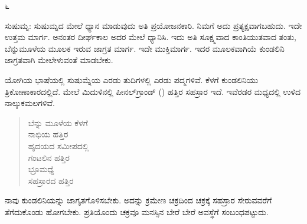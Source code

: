 \begin{center}
೬
\end{center}

ಸುಷುಮ್ನ: ಸುಷುಮ್ನದ ಮೇಲೆ ಧ್ಯಾನ ಮಾಡುವುದು ಅತಿ ಪ್ರಯೋಜನಕಾರಿ. ನಿಮಗೆ ಅದು ಪ್ರತ್ಯಕ್ಷವಾಗಬಹುದು. ಇದೇ ಉತ್ತಮ ಮಾರ್ಗ. ಅನಂತರ ದೀರ್ಘಕಾಲ ಅದರ ಮೇಲೆ ಧ್ಯಾನಿಸಿ. ಇದು ಅತಿ ಸೂಕ್ಷ್ಮವಾದ ಕಾಂತಿಯುತವಾದ ತಂತು, ಬೆನ್ನುಮೂಳೆಯ ಮೂಲಕ ಇರುವ ಜಾಗ್ರತ ಮಾರ್ಗ. ಇದೇ ಮುಕ್ತಿಮಾರ್ಗ. ಇದರ ಮೂಲಕವಾಗಿಯೆ ಕುಂಡಲಿನಿ ಜಾಗ್ರತವಾಗಿ ಮೇಲೇಳುವಂತೆ ಮಾಡಬೇಕು.

ಯೋಗಿಯ ಭಾಷೆಯಲ್ಲಿ ಸುಷುಮ್ನೆಯ ಎರಡು ತುದಿಗಳಲ್ಲಿ ಎರಡು ಪದ್ಮಗಳಿವೆ. ಕೆಳಗೆ ಕುಂಡಲಿನಿಯು ತ್ರಿಕೋಣಾಕಾರದಲ್ಲಿದೆ. ಮೇಲೆ ಮಿದುಳಿನಲ್ಲಿ ಪೀನಲ್‌ಗ್ರಾಂಡ್ () ಹತ್ತಿರ ಸಹಸ್ರಾರ ಇದೆ. ಇವೆರಡರ ಮಧ್ಯದಲ್ಲಿ ಉಳಿದ ನಾಲ್ಕು\break ಕಮಲಗಳಿವೆ.

\begin{verse}
ಬೆನ್ನು ಮೂಳೆಯ ಕೆಳಗೆ\\ನಾಭಿಯ ಹತ್ತಿರ\\ಹೃದಯದ ಸಮೀಪದಲ್ಲಿ\\ಗಂಟಲಿನ ಹತ್ತಿರ\\ಭ್ರೂಮಧ್ಯೆ\\ಸಹಸ್ರಾರದ ಹತ್ತಿರ
\end{verse}

ನಾವು ಕುಂಡಲಿನಿಯನ್ನು ಜಾಗೃತಗೊಳಿಸಬೇಕು. ಅದನ್ನು ಕ್ರಮೇಣ ಚಕ್ರದಿಂದ ಚಕ್ರಕ್ಕೆ ಸಹಸ್ರಾರ ಸೇರುವವರೆಗೆ ತೆಗೆದುಕೊಂಡು ಹೋಗಬೇಕು. ಪ್ರತಿಯೊಂದು ಚಕ್ರವೂ ಮನಸ್ಸಿನ ಬೇರೆ ಬೇರೆ ಅವಸ್ಥೆಗೆ ಸಂಬಂಧಪಟ್ಟುದು.

